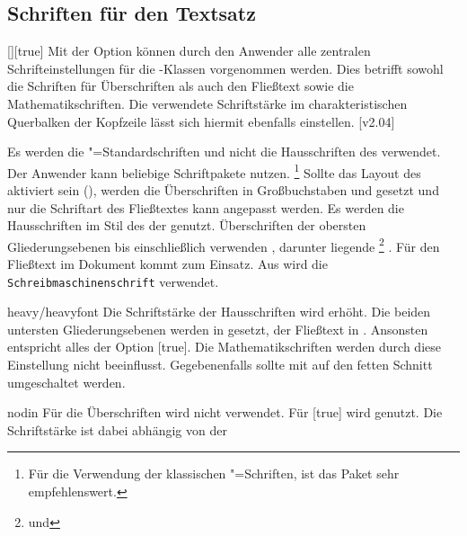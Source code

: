 \subsection{Schriften für den Textsatz}
\begin{Declaration}{[\PSet]}[true]%
\printdeclarationlist%
\label{sec:text}%
%
%
Mit der Option  können durch den Anwender alle zentralen 
Schrifteinstellungen für die \TUDScript-Klassen vorgenommen werden. Dies 
betrifft sowohl die Schriften für Überschriften als auch den Fließtext sowie 
die Mathematikschriften. Die verwendete Schriftstärke im charakteristischen 
Querbalken der Kopfzeile lässt sich hiermit ebenfalls einstellen.
[v2.04]
%
\begin{values}
\itemfalse
  Es werden die "=Standardschriften und nicht die Hausschriften 
  des \CDs verwendet. Der Anwender kann beliebige Schriftpakete nutzen.%
  \footnote{%
    Für die Verwendung der klassischen "=Schriften, ist das Paket 
     sehr empfehlenswert.%
  }
  Sollte das Layout des \CDs aktiviert sein (), werden die 
  Überschriften in Großbuchstaben und \DIN gesetzt und nur die Schriftart des 
  Fließtextes kann angepasst werden.
  Es werden die Hausschriften im Stil des \CDs der \TnUD genutzt. Überschriften 
  der obersten Gliederungsebenen bis einschließlich  
  verwenden \DIN, darunter liegende%
  \footnote{ und } 
  . Für den Fließtext im Dokument kommt 
   zum Einsatz. Aus  wird die
  \texttt{Schreibmaschinenschrift} verwendet.
\item[heavy/heavyfont]
  Die Schriftstärke der Hausschriften wird erhöht. Die beiden untersten 
  Gliederungsebenen werden in  gesetzt, der Fließtext 
  in . Ansonsten entspricht alles der Option 
  [true]. Die Mathematikschriften werden durch diese 
  Einstellung nicht beeinflusst. Gegebenenfalls sollte mit  auf 
  den fetten Schnitt umgeschaltet werden.
\item[nodin]
  Für die Überschriften wird \DIN nicht verwendet. Für [true] 
  wird \Univers genutzt. Die Schriftstärke ist dabei abhängig von der   

\end{values}
\end{Declaration}
